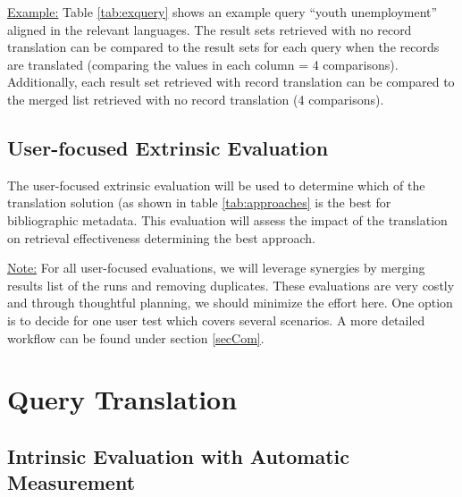 \documentclass[a4paper,11pt]{article}
\begin{document}
\underline{Example:}
\newline
Table \ref{tab:exquery} shows an example query “youth unemployment” aligned in the relevant languages. The result sets retrieved with no record translation can be compared to the result sets for each query when the records are translated (comparing the values in each column = 4 comparisons). Additionally, each result set retrieved with record translation can be compared to the merged list retrieved with no record translation (4 comparisons).
\begin{table}[h]
  \caption{Example of an aligned query and baseline number of retrieved documents.}
 \label{tab:exquery}
\end{table}

\subsection{User-focused Extrinsic Evaluation}
\label{ss:user_eval}
The user-focused extrinsic evaluation will be used to determine which of the translation solution (as shown in table \ref{tab:approaches} is the best for bibliographic metadata. This evaluation will assess the impact of the translation on retrieval effectiveness determining the best approach. 

\underline{Note:} For all user-focused evaluations, we will leverage synergies by merging results list of the runs and removing duplicates. These evaluations are very costly and through thoughtful planning, we should minimize the effort here. One option is to decide for one user test which covers several scenarios. A more detailed workflow can be found under section \ref{secCom}.

\section{Query Translation}
\subsection{Intrinsic Evaluation with Automatic Measurement}
\end{document}
